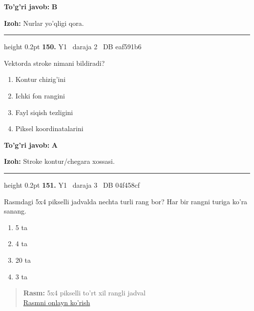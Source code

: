 \documentclass[10pt,a4paper,oneside]{article}
\begin{document}
\begin{tcolorbox}[enhanced,breakable,colback=teal!4,colframe=teal!45!black,boxrule=0.45pt,arc=1.2mm,left=2.8mm,right=2.8mm,top=2mm,bottom=2mm,before skip=2mm,after skip=2mm]
\textbf{\color{teal}To'g'ri javob:} \textbf{B}
\par\smallskip
\textbf{Izoh:} Nurlar yo'qligi qora.
\end{tcolorbox}
\vspace{2mm}\hrule height 0.2pt \vspace{4mm}
\hypertarget{q150}{\textbf{\color{ink}150.}}  {\color{muted}\scriptsize Y1 \textbullet\ daraja 2 \textbullet\ DB eaf591b6}
\par
Vektorda stroke nimani bildiradi?
\begin{enumerate}[label=\Alph*),leftmargin=9mm]
\item Kontur chizig'ini
\item Ichki fon rangini
\item Fayl siqish tezligini
\item Piksel koordinatalarini
\end{enumerate}
\begin{tcolorbox}[enhanced,breakable,colback=teal!4,colframe=teal!45!black,boxrule=0.45pt,arc=1.2mm,left=2.8mm,right=2.8mm,top=2mm,bottom=2mm,before skip=2mm,after skip=2mm]
\textbf{\color{teal}To'g'ri javob:} \textbf{A}
\par\smallskip
\textbf{Izoh:} Stroke kontur/chegara xossasi.
\end{tcolorbox}
\vspace{2mm}\hrule height 0.2pt \vspace{4mm}
\hypertarget{q151}{\textbf{\color{ink}151.}}  {\color{muted}\scriptsize Y1 \textbullet\ daraja 3 \textbullet\ DB 04f458cf}
\par
Rasmdagi 5x4 pikselli jadvalda nechta turli rang bor? Har bir rangni turiga ko'ra sanang.
\begin{enumerate}[label=\Alph*),leftmargin=9mm]
\item 5 ta
\item 4 ta
\item 20 ta
\item 3 ta
\end{enumerate}
\begin{quote}\footnotesize\color{muted}\textbf{Rasm:} 5x4 pikselli to'rt xil rangli jadval\\
\href{https://github.com/sarvar9417/attestatsiya/blob/main/public/graphics-web-v2/palette_grid.svg}{Rasmni onlayn ko'rish}
\end{quote}
\end{document}
